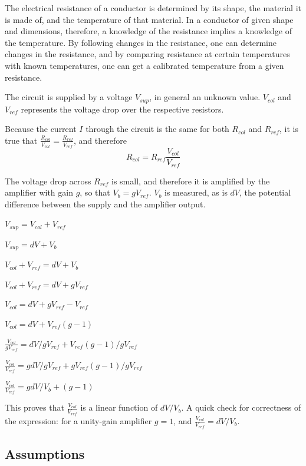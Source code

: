 The electrical resistance of a conductor is determined by its shape, the
material it is made of, and the temperature of that material. In a conductor of
given shape and dimensions, therefore, a knowledge of the resistance implies a
knowledge of the temperature. By following changes in the resistance, one can
determine changes in the resistance, and by comparing resistance at certain
temperatures with known temperatures, one can get a calibrated temperature from
a given resistance.

The circuit is supplied by a voltage $V_{sup}$, in general an unknown value.
$V_{col}$ and $V_{ref}$ represents the voltage drop over the respective
resistors.

Because the current $I$ through the circuit is the same for both $R_{col}$ and
$R_{ref}$, it is true that $\frac{R_{col}}{V_{col}}=\frac{R_{ref}}{V_{ref}}$,
and therefore \begin{equation}R_{col} = R_{ref}\frac{V_{col}}{V_{ref}}
\end{equation}

The voltage drop across $R_{ref}$ is small, and therefore it is amplified by the
amplifier with gain $g$, so that $V_b = gV_{ref}$. $V_b$ is measured, as is
$dV$, the potential difference between the supply and the amplifier output.

$V_{sup} = V_{col} + V_{ref}$ 

$V_{sup}=dV + V_b$

$V_{col} + V_{ref} = dV + V_b$

$V_{col} + V_{ref} = dV + gV_{ref}$

$V_{col} = dV + gV_{ref} - V_{ref} $

$V_{col} = dV + V_{ref}(g - 1)$

$\frac{\displaystyle V_{col}}{\displaystyle gV_{ref}} = dV/gV_{ref} + V_{ref}(g-1)/gV_{ref}$

$\frac{\displaystyle V_{col}}{\displaystyle V_{ref}} = gdV/gV_{ref} + gV_{ref}(g-1)/gV_{ref}$

$\frac{\displaystyle V_{col}}{\displaystyle V_{ref}} = gdV/V_b + (g-1)$

This proves that $\frac{\displaystyle V_{col}}{\displaystyle V_{ref}}$ is a
linear function of $dV/V_b$. A quick check for correctness of the expression:
for a unity-gain amplifier $g = 1$, and $\frac{\displaystyle
V_{col}}{\displaystyle V_{ref}} = dV/V_b$.


\subsection{Assumptions}


